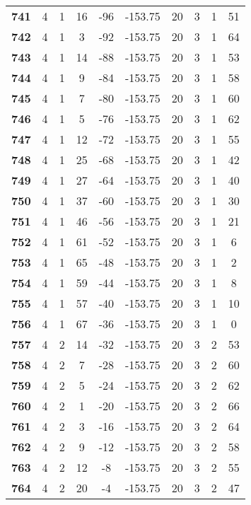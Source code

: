 \documentclass{article}%
\begin{document}
\begin{longtable}{cccccccccc}
        \textbf{741} & 4 & 1 & 16 & -96 & -153.75 & 20 & 3 & 1 & 51 \\ 
        \textbf{742} & 4 & 1 & 3 & -92 & -153.75 & 20 & 3 & 1 & 64 \\ 
        \textbf{743} & 4 & 1 & 14 & -88 & -153.75 & 20 & 3 & 1 & 53 \\ 
        \textbf{744} & 4 & 1 & 9 & -84 & -153.75 & 20 & 3 & 1 & 58 \\ 
        \textbf{745} & 4 & 1 & 7 & -80 & -153.75 & 20 & 3 & 1 & 60 \\ 
        \textbf{746} & 4 & 1 & 5 & -76 & -153.75 & 20 & 3 & 1 & 62 \\ 
        \textbf{747} & 4 & 1 & 12 & -72 & -153.75 & 20 & 3 & 1 & 55 \\ 
        \textbf{748} & 4 & 1 & 25 & -68 & -153.75 & 20 & 3 & 1 & 42 \\ 
        \textbf{749} & 4 & 1 & 27 & -64 & -153.75 & 20 & 3 & 1 & 40 \\ 
        \textbf{750} & 4 & 1 & 37 & -60 & -153.75 & 20 & 3 & 1 & 30 \\ 
        \textbf{751} & 4 & 1 & 46 & -56 & -153.75 & 20 & 3 & 1 & 21 \\ 
        \textbf{752} & 4 & 1 & 61 & -52 & -153.75 & 20 & 3 & 1 & 6 \\ 
        \textbf{753} & 4 & 1 & 65 & -48 & -153.75 & 20 & 3 & 1 & 2 \\ 
        \textbf{754} & 4 & 1 & 59 & -44 & -153.75 & 20 & 3 & 1 & 8 \\ 
        \textbf{755} & 4 & 1 & 57 & -40 & -153.75 & 20 & 3 & 1 & 10 \\ 
        \textbf{756} & 4 & 1 & 67 & -36 & -153.75 & 20 & 3 & 1 & 0 \\ 
        \textbf{757} & 4 & 2 & 14 & -32 & -153.75 & 20 & 3 & 2 & 53 \\ 
        \textbf{758} & 4 & 2 & 7 & -28 & -153.75 & 20 & 3 & 2 & 60 \\ 
        \textbf{759} & 4 & 2 & 5 & -24 & -153.75 & 20 & 3 & 2 & 62 \\ 
        \textbf{760} & 4 & 2 & 1 & -20 & -153.75 & 20 & 3 & 2 & 66 \\ 
        \textbf{761} & 4 & 2 & 3 & -16 & -153.75 & 20 & 3 & 2 & 64 \\ 
        \textbf{762} & 4 & 2 & 9 & -12 & -153.75 & 20 & 3 & 2 & 58 \\ 
        \textbf{763} & 4 & 2 & 12 & -8 & -153.75 & 20 & 3 & 2 & 55 \\ 
        \textbf{764} & 4 & 2 & 20 & -4 & -153.75 & 20 & 3 & 2 & 47 \\ 

\end{longtable}
\end{document}
